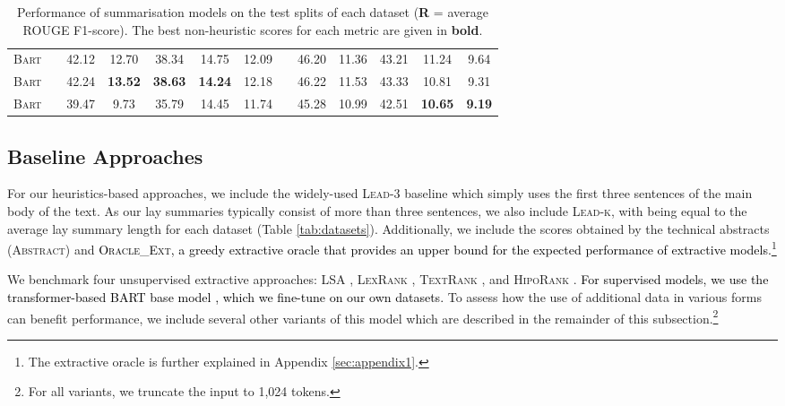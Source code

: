 \documentclass[11pt]{article}
\begin{document}
\begin{table*}[ht]
{\begin{tabular}{llccccccccccc}
\hspace{8pt} \textsc{Bart}  && 42.12 & 12.70 & 38.34 & 14.75 & 12.09 && 46.20 & 11.36 & 43.21 & 11.24 & 9.64 \\
           \hspace{8pt} \textsc{Bart}  && 42.24 & \textbf{13.52} & \textbf{38.63} & \textbf{14.24} & 12.18  &&  46.22 & 11.53 & 43.33 & 10.81 & 9.31 \\
           \hspace{8pt} \textsc{Bart}  && 39.47 & 9.73 & 35.79 & 14.45 & 11.74 && 45.28 & 10.99 & 42.51 & \textbf{10.65} & \textbf{9.19} \\ 
\hline
    \end{tabular}
    }
    \caption{Performance of summarisation models on the test splits of each dataset (\textbf{R} = average ROUGE F1-score). The best non-heuristic scores for each metric are given in \textbf{bold}.}
    \label{tab:summ_results}
\end{table*}

\subsection{Baseline Approaches} \label{subsec:results-baselines}
For our heuristics-based approaches, we include the widely-used \textsc{Lead-3} baseline which simply uses the first three sentences of the main body of the text. As our lay summaries typically consist of more than three sentences, we also include \textsc{Lead-k},
with  being equal to the average lay summary length for each dataset (Table \ref{tab:datasets}). Additionally, we include the scores obtained by the technical abstracts (\textsc{Abstract}) and \textcolor{black}{\textsc{Oracle\_Ext}, a greedy extractive oracle \citep{Nallapati2017}
that provides an upper bound for the expected performance of extractive models.}\footnote{The extractive oracle is further explained in Appendix \ref{sec:appendix1}.}


We benchmark four unsupervised extractive approaches: \textsc{LSA} \citep{Steinberger2004}, \textsc{LexRank} \citep{Erkan_2004}, \textsc{TextRank} \citep{mihalcea-tarau-2004-textrank}, and \textsc{HipoRank} \citep{Dong2021-yh}.
\textcolor{black}{For supervised models, we use the transformer-based \textsc{BART} base model \citep{lewis-etal-2020-bart}, which we fine-tune on our own datasets.} 
To assess how the use of additional data in various forms can benefit performance, we include several other variants of this model which are described in the remainder of this subsection.\footnote{For all variants, we truncate the input to 1,024 tokens.}
\end{document}
